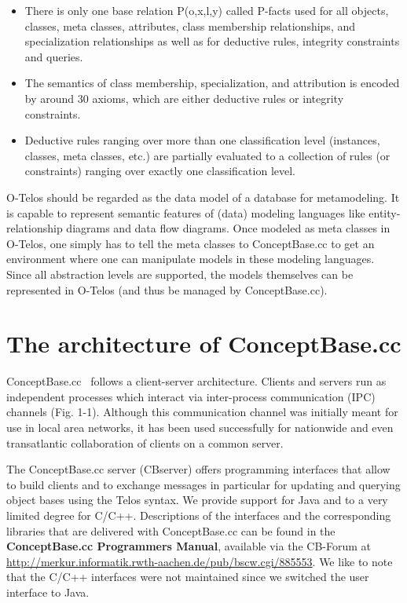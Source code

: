 \begin{itemize}
\item There is only one base relation P(o,x,l,y) called P-facts used for all objects, classes, meta classes, 
attributes, class membership relationships, and specialization relationships as well as for 
deductive rules, integrity constraints and queries.
\item The semantics of class membership, specialization, and attribution is encoded by around 30 axioms, 
which are either deductive rules or integrity constraints.
\item Deductive rules ranging over more than one classification level (instances, classes, meta 
classes, etc.) are partially evaluated to a collection of rules (or constraints) ranging over 
exactly one classification level.
\end{itemize}

O-Telos should be regarded as the data model of a database for metamodeling. It is capable to 
represent semantic features of (data) modeling languages like entity-relationship diagrams and 
data flow diagrams. Once modeled as meta classes in O-Telos, one simply has to tell the meta 
classes to ConceptBase.cc to get an environment where one can manipulate models in these modeling languages. 
Since all abstraction levels are supported, the models themselves can be represented in 
O-Telos (and thus be managed by ConceptBase.cc).






\section{The architecture of ConceptBase.cc}
\label{sec:architecture}

ConceptBase.cc \relnr\ follows a client-server architecture. Clients and servers
run as independent processes which interact via inter-process communication
(IPC) channels (Fig. 1-1).  Although this communication channel was
initially meant for use in local area networks, it has been used
successfully for nationwide and even transatlantic collaboration of clients
on a common server.

The ConceptBase.cc server (CBserver) offers programming interfaces that allow to build
clients and to exchange messages in particular for updating and querying
object bases using the Telos syntax. We provide support for Java and to a very limited
degree for C/C++. 
Descriptions of the interfaces and the corresponding
libraries that are delivered with ConceptBase.cc can be found in the {\bfseries
ConceptBase.cc Programmers Manual}, available via the CB-Forum at
\url{http://merkur.informatik.rwth-aachen.de/pub/bscw.cgi/885553}.
We like to note that the C/C++ interfaces
were not maintained since we switched the user interface to Java. 

